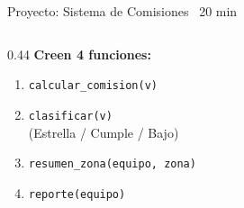 \documentclass[aspectratio=169, 11pt]{beamer}
\begin{document}
\begin{frame}[fragile,shrink=30]{Proyecto: Sistema de Comisiones \hfill
    {\normalsize\color{arcaRed}\faClock\ 20 min}}
\begin{columns}[T]
\begin{column}{0.44\textwidth}
      \vspace{4pt}
      {\footnotesize\color{arcaDark}\bfseries Creen 4 funciones:}
      {\scriptsize
      \begin{enumerate}\setlength{\itemsep}{2pt}
        \item \texttt{calcular\_comision(v)}
        \item \texttt{clasificar(v)}
              \\ {\color{textMuted}(Estrella / Cumple / Bajo)}
        \item \texttt{resumen\_zona(equipo, zona)}
        \item \texttt{reporte(equipo)}
      \end{enumerate}
      }
    \end{column}
  \end{columns}
\end{frame}
\end{document}
